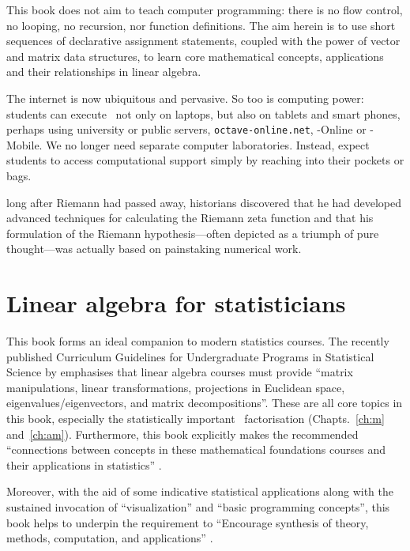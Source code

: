 This book does not aim to teach computer programming: there is no flow control, no looping, no recursion, nor function definitions.
The aim herein is to use short sequences of declarative assignment statements, coupled with the power of vector and matrix data structures, to learn core mathematical concepts, applications and their relationships in linear algebra. 

The internet is now ubiquitous and pervasive. 
So too is computing power: students can execute \script\ not only on laptops, but also on tablets and smart phones, perhaps using university or public servers, \verb|octave-online.net|, \script[1]-Online or \script[1]-Mobile. 
We no longer need separate computer laboratories.
Instead, expect students to access computational support simply by reaching into their pockets or bags.

\begin{quoted}{\cite{Donoho2015}}
long after Riemann had passed away, historians discovered that he had developed advanced techniques for calculating the Riemann zeta function and that his formulation of the Riemann hypothesis---often depicted as a triumph of pure thought---was actually based on painstaking numerical work.
\end{quoted}







\section*{Linear algebra for statisticians}

This book forms an ideal companion to modern statistics courses.
The recently published Curriculum Guidelines for Undergraduate Programs in Statistical Science by \cite{StatsEduGuidelines2014} emphasises that linear algebra courses must provide ``matrix manipulations, linear transformations, projections in Euclidean space, eigenvalues\slash eigenvectors, and matrix decompositions''.
These are all core topics in this book, especially the statistically important \svd\ factorisation (Chapts.~\ref{ch:m} and~\ref{ch:am}).
Furthermore, this book explicitly makes the recommended ``connections between concepts in these mathematical foundations courses and their applications in statistics'' \cite[p.12]{StatsEduGuidelines2014}.

Moreover, with the aid of some indicative statistical applications along with the sustained invocation of ``visualization'' and  ``basic programming concepts'', this book helps to underpin the requirement to ``Encourage synthesis of theory, methods, computation, and applications'' \cite[p.13]{StatsEduGuidelines2014}.






